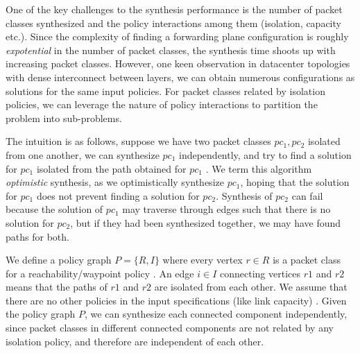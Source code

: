 
One of the key challenges to the synthesis performance is the number
of packet classes synthesized and the policy interactions among them
(isolation, capacity etc.). Since the complexity of finding a
forwarding plane configuration is roughly \emph{expotential} in the
number of packet classes, the synthesis time shoots up with increasing
packet classes.  However, one keen observation in datacenter
topologies with dense interconnect between layers, we can obtain
numerous configurations as solutions for the same input
policies.  For packet classes
related by  isolation policies, we
can leverage the nature of policy interactions to partition the
problem into sub-problems.

The intuition is as follows, suppose we have two packet classes $pc_1,
pc_2$ isolated from one another, we can synthesize $pc_1$
independently, and try to find a solution for $pc_1$ isolated from the
path obtained for $pc_1$ . We term this
algorithm \emph{optimistic} synthesis, as we optimistically synthesize
$pc_1$, hoping that the solution for $pc_1$ does not prevent finding a
solution for $pc_2$. Synthesis of $pc_2$ can fail because the solution
of $pc_1$ may traverse through edges such that there is no solution
for $pc_2$, but if they had been synthesized together, we may have
found paths for both.


We define a policy graph $P = \{R, I\}$ where every vertex $r \in R$
is a packet class for a reachability/waypoint policy . An edge $i \in I$ connecting
vertices $r1$ and $r2$ means that the paths of $r1$ and $r2$ are
isolated from each other. We assume that there are no other policies
in the input specifications (like link capacity) . Given the policy graph $P$, we
can synthesize each connected component independently, since packet
classes in different connected components are not related by any
isolation policy, and therefore are independent of each other.

